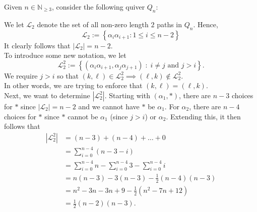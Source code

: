 \documentclass{article}
\renewcommand{\L}{\mathcal{L}}
\begin{document}
\begin{flushleft}
Given $n \in \mathbb{N}_{\geq 3}$, consider the following quiver $Q_n$:
\begin{center}
\end{center}
We let $\mathcal{L}_2$ denote the set of all non-zero length $2$ paths in $Q_n$. Hence,
\[
\mathcal{L}_2 := \left\{\alpha_i \alpha_{i+1} : 1 \leq i \leq n-2\right\}
\]
It clearly follows that $\left|\L_2\right| = n-2.$ \\[\baselineskip]

To introduce some new notation, we let 
\[\L_2^2 := \left\{(\alpha_i\alpha_{i+1}, \alpha_j\alpha_{j+1}) \; : \; i \neq j \text{ and } j > i\right\}.
\]
We require $j > i$ so that $(k, \ell) \in \L_2^2 \implies (\ell, k) \not\in \L_2^2$. \\
In other words, we are trying to enforce that $(k, \ell) = (\ell, k)$. \\[\baselineskip]

Next, we want to determine $\left|\L_2^2\right|$. Starting with $(\alpha_1, \ast)$, there are $n-3$
choices for $\ast$ since $|\L_2| = n-2$ and we cannot have $\ast$ be $\alpha_1$. For $\alpha_2$, 
there are $n-4$ choices for $\ast$ since $\ast$ cannot be $\alpha_1$ (since $j >i$) or $\alpha_2$.
Extending this, it then follows that 
\begin{align*}
   \left|\L_2^2\right| &= (n-3) + (n-4) + \ldots + 0 \\
                       &= \sum_{i=0}^{n-4} (n-3-i) \\
                       &= \sum_{i=0}^{n-4} n - \sum_{i=0}^{n-4} 3 - \sum_{i=0}^{n-4} i \\
                       &= n(n-3) - 3(n-3) - \frac{1}{2}(n-4)(n-3) \\
                       &= n^2 - 3n - 3n + 9 - \frac{1}{2}\left(n^2 - 7n + 12\right) \\
                       &= \frac{1}{2}(n-2)(n-3).
\end{align*}
\end{flushleft}
\end{document}
